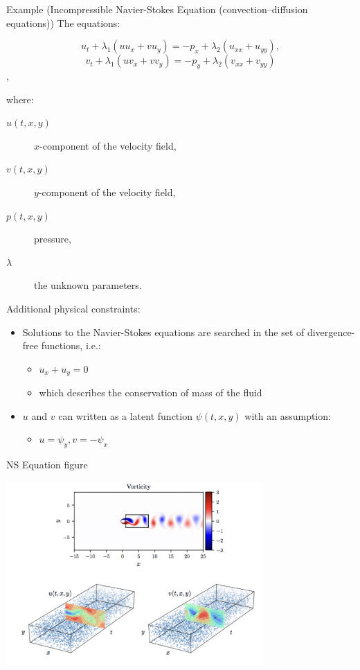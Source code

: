 \documentclass[aspectratio=1610,xcolor={dvipsnames},hyperref={colorlinks,unicode,linkcolor=violet,anchorcolor=BlueViolet,citecolor=YellowOrange,filecolor=black,urlcolor=Aquamarine}]{beamer}
\begin{document}
\begin{frame}[allowframebreaks]{Example (Incompressible Navier-Stokes Equation (convection–diffusion equations))}
The equations:

\[u_t + \lambda_1 (u u_x + v u_y) = -p_x + \lambda_2(u_{xx} + u_{yy}),\]
\[v_t + \lambda_1 (u v_x + v v_y) = -p_y + \lambda_2(v_{xx} + v_{yy})\],

where:
\begin{description}
\item[{\(u(t, x, y)\)}] \(x\)-component of the velocity field,
\item[{\(v(t, x, y)\)}] \(y\)-component of the velocity field,
\item[{\(p(t, x, y)\)}] pressure,
\item[{\(\lambda\)}] the unknown parameters.
\end{description}

Additional physical constraints:

\begin{itemize}
\item Solutions to the Navier-Stokes equations are searched in the set of divergence-free functions, i.e.:
\begin{itemize}
\item \(u_{x} + u_{y} = 0\)
\item which describes the conservation of mass of the fluid
\end{itemize}
\item \(u\) and \(v\) can written as a latent function \(\psi(t, x, y)\) with an assumption:
\begin{itemize}
\item \(u = \psi_{y}, v = -\psi_{x}\)
\end{itemize}
\end{itemize}
\end{frame}

\begin{frame}[label={sec:org5ffd44c}]{NS Equation figure}
\begin{center}
\includegraphics[height=7cm]{./p8.png}
\end{center}
\end{frame}
\end{document}
